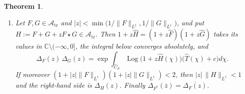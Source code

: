 \documentclass[11pt]{amsart}
\newtheorem{theorem}{Theorem}[section]
\theoremstyle{definition}
\theoremstyle{remark}
\newcommand{\C}{\mathbb C}
\newcommand{\Th}{\widehat{T}}
\newcommand{\Ch}{\widehat{C}_S}
\begin{document}
\begin{theorem}
\begin{enumerate}
$\Delta_F(z):=\exp\log\Delta_F(z)$, the determinant of $1+zF$ relative to
$T$.
\item[(f)] Let $F,G\in\mathcal A_{\mathrm{tr}}$ and
$|z|<\min\bigl(1/\lVert F\rVert_{L^{1}},1/\lVert G\rVert_{L^{1}}\bigr)$, and
put $H:=F+G+zF\star G\in\mathcal A_{\mathrm{tr}}$.  Then
$1+z\widehat H=(1+z\widehat F)(1+z\widehat G)$ takes its values in
$\C\setminus(-\infty,0]$, the integral below converges absolutely, and
\begin{equation}\label{eq:multiplicative}
\Delta_F(z)\,\Delta_G(z)=\exp\int_{\Ch}\operatorname{Log}\bigl(1+z\widehat H(\chi)\bigr)
\bigl(\Th(\chi)+c\bigr)d\chi .
\end{equation}
If moreover
$(1+|z|\lVert F\rVert_{L^{1}})(1+|z|\lVert G\rVert_{L^{1}})<2$, then
$|z|\,\lVert H\rVert_{L^{1}}<1$ and the right-hand side is $\Delta_H(z)$.
Finally $\Delta_{F^{\dagger}}(\bar z)=\overline{\Delta_F(z)}$.
\end{enumerate}
\end{theorem}
\end{document}
